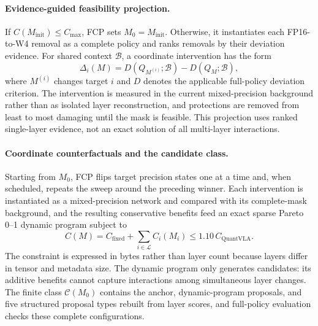 \paragraph{Evidence-guided feasibility projection.}
If $C(M_{\mathrm{init}})\le C_{\max}$, FCP sets $M_0=M_{\mathrm{init}}$. Otherwise, it instantiates each FP16-to-W4 removal as a complete policy and ranks removals by their deviation evidence. For shared context $\mathcal B$, a coordinate intervention has the form
\begin{equation}
 \Delta_i(M)=D(Q_{M^{(i)}};\mathcal B)-D(Q_M;\mathcal B),
 \label{eq:full_policy_intervention}
\end{equation}
where $M^{(i)}$ changes target $i$ and $D$ denotes the applicable full-policy deviation criterion. The intervention is measured in the current mixed-precision background rather than as isolated layer reconstruction, and protections are removed from least to most damaging until the mask is feasible. This projection uses ranked single-layer evidence, not an exact solution of all multi-layer interactions.

\paragraph{Coordinate counterfactuals and the candidate class.}
Starting from $M_0$, FCP flips target precision states one at a time and, when scheduled, repeats the sweep around the preceding winner. Each intervention is instantiated as a mixed-precision network and compared with its complete-mask background, and the resulting conservative benefits feed an exact sparse Pareto 0--1 dynamic program subject to
\begin{equation}
 C(M)=C_{\mathrm{fixed}}+\sum_{i\in\mathcal{L}}C_i(M_i)
 \le 1.10\,C_{\mathrm{QuantVLA}}.
 \label{eq:budget}
\end{equation}
The constraint is expressed in bytes rather than layer count because layers differ in tensor and metadata size. The dynamic program only generates candidates: its additive benefits cannot capture interactions among simultaneous layer changes. The finite class $\mathcal C(M_0)$ contains the anchor, dynamic-program proposals, and five structured proposal types rebuilt from layer scores, and full-policy evaluation checks these complete configurations.

